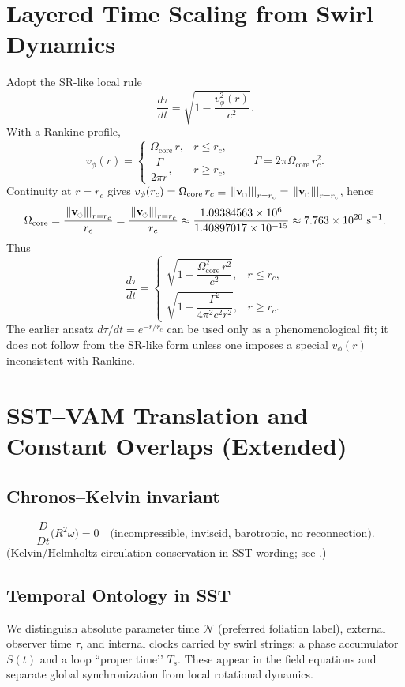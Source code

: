 \documentclass[11pt]{article}
\newcommand{\vscore}{v_s}                                %
\newcommand{\vnorm}{\lVert \mathbf{v}_{\mkern-2mu\scriptscriptstyle\boldsymbol{\circlearrowleft}} \rVert}               %
\providecommand{\rc}{r_c} %
\newcommand{\vcore}{\left.\vnorm\right|_{r=\rc}}        %
\renewcommand{\vscore}{\vcore}
\newcommand{\ChronosKelvinEq}{\dfrac{D}{Dt}\!\big(R^{2}\omega\big)=0\quad\text{(incompressible, inviscid, barotropic, no reconnection)}.}
\begin{document}
	\section{Layered Time Scaling from Swirl Dynamics}
	Adopt the SR-like local rule
	\[
		\frac{d\tau}{dt}=\sqrt{1-\frac{v_\phi^{2}(r)}{c^{2}}}.
	\]
	With a Rankine profile,
	\[
		v_\phi(r)=
		\begin{cases}
			\Omega_{\text{core}}\,r, & r\le r_c,\\[4pt]
			\dfrac{\Gamma}{2\pi r}, & r\ge r_c,
		\end{cases}
		\qquad \Gamma=2\pi\Omega_{\text{core}}\,r_c^{2}.
	\]
	Continuity at $r=r_c$ gives $v_\phi(r_c)=\Omega_{\text{core}}\,r_c\equiv \vscore=\left.\vnorm\right|_{r=\rc}$, hence
	\[
		\Omega_{\text{core}}=\frac{\vscore}{r_c}=\frac{\left.\vnorm\right|_{r=\rc}}{\rc}\approx \frac{1.09384563\times 10^{6}}{1.40897017\times 10^{-15}}
		\approx 7.763\times 10^{20}\ \mathrm{s^{-1}}.
	\]
	Thus
	\[
		\frac{d\tau}{dt}=
		\begin{cases}
			\sqrt{1-\dfrac{\Omega_{\text{core}}^{2}\,r^{2}}{c^{2}}}, & r\le r_c,\\[6pt]
			\sqrt{1-\dfrac{\Gamma^{2}}{4\pi^{2}c^{2}r^{2}}}, & r\ge r_c.
		\end{cases}
	\]
	The earlier ansatz $d\tau/d\bar t=e^{-r/r_c}$ can be used only as a phenomenological fit; it does not follow from the SR-like form unless one imposes a special $v_\phi(r)$ inconsistent with Rankine.


    \section{SST--VAM Translation and Constant Overlaps (Extended)}
    \normalsize
    \subsection*{Chronos--Kelvin invariant}
        \[
            \ChronosKelvinEq
        \]
        \noindent (Kelvin/Helmholtz circulation conservation in SST wording; see \cite{Helmholtz1858,Kelvin1869,Batchelor1967,Saffman1992}.)
    \subsection*{Temporal Ontology in SST}
        We distinguish absolute parameter time $\mathcal{N}$ (preferred foliation label), external observer time $\tau$, and internal clocks carried by swirl strings: a phase accumulator $S(t)$ and a loop “proper time’’ $T_{\!s}$. These appear in the field equations and separate global synchronization from local rotational dynamics.
\end{document}
